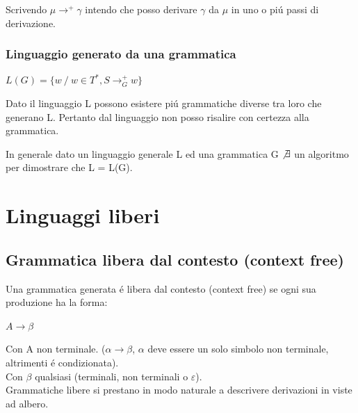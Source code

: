 Scrivendo $\mu \rightarrow ^+ \gamma $ intendo che posso derivare $\gamma$ da $\mu$ in uno o pi\'u passi di derivazione.

\subsection{Linguaggio generato da una grammatica}
\begin{center}
	$L(G) = \{w\ / \ w \in T^*, S \rightarrow ^{+}_{G} w \} $
\end{center}
Dato il linguaggio L possono esistere pi\'u grammatiche diverse tra loro che generano L.
Pertanto dal linguaggio non posso risalire con certezza alla grammatica.

\begin{tcolorbox}\begin{center}
	In generale dato un linguaggio generale L ed una grammatica G $\not\exists$ un algoritmo per dimostrare che L = L(G).
\end{center}\end{tcolorbox}

\chapter{Linguaggi liberi}
\section{Grammatica libera dal contesto (context free)}
Una grammatica generata \'e libera dal contesto (context free) se ogni sua produzione ha la forma: 

\begin{center}
	$A \rightarrow \beta$
\end{center}
Con A non terminale. ($\alpha \rightarrow \beta$, $\alpha$ deve essere un solo simbolo non terminale, altrimenti \'e condizionata).\\
Con $\beta$ qualsiasi (terminali, non terminali o $\varepsilon$).\\[5pt]
Grammatiche libere si prestano in modo naturale a descrivere derivazioni in viste ad albero.

